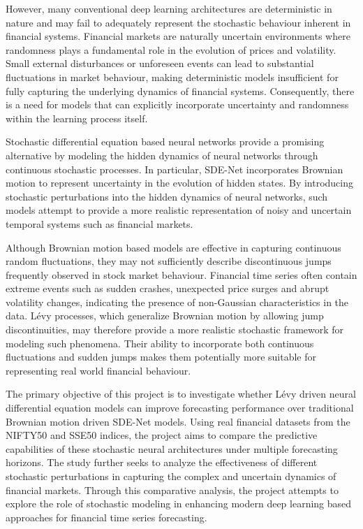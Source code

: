 However, many conventional deep learning architectures are deterministic in nature and may fail to adequately represent the stochastic behaviour inherent in financial systems. Financial markets are naturally uncertain environments where randomness plays a fundamental role in the evolution of prices and volatility. Small external disturbances or unforeseen events can lead to substantial fluctuations in market behaviour, making deterministic models insufficient for fully capturing the underlying dynamics of financial systems. Consequently, there is a need for models that can explicitly incorporate uncertainty and randomness within the learning process itself.

Stochastic differential equation based neural networks provide a promising alternative by modeling the hidden dynamics of neural networks through continuous stochastic processes. In particular, SDE-Net incorporates Brownian motion to represent uncertainty in the evolution of hidden states. By introducing stochastic perturbations into the hidden dynamics of neural networks, such models attempt to provide a more realistic representation of noisy and uncertain temporal systems such as financial markets.

Although Brownian motion based models are effective in capturing continuous random fluctuations, they may not sufficiently describe discontinuous jumps frequently observed in stock market behaviour. Financial time series often contain extreme events such as sudden crashes, unexpected price surges and abrupt volatility changes, indicating the presence of non-Gaussian characteristics in the data. Lévy processes, which generalize Brownian motion by allowing jump discontinuities, may therefore provide a more realistic stochastic framework for modeling such phenomena. Their ability to incorporate both continuous fluctuations and sudden jumps makes them potentially more suitable for representing real world financial behaviour.

The primary objective of this project is to investigate whether Lévy driven neural differential equation models can improve forecasting performance over traditional Brownian motion driven SDE-Net models. Using real financial datasets from the NIFTY50 and SSE50 indices, the project aims to compare the predictive capabilities of these stochastic neural architectures under multiple forecasting horizons. The study further seeks to analyze the effectiveness of different stochastic perturbations in capturing the complex and uncertain dynamics of financial markets. Through this comparative analysis, the project attempts to explore the role of stochastic modeling in enhancing modern deep learning based approaches for financial time series forecasting.